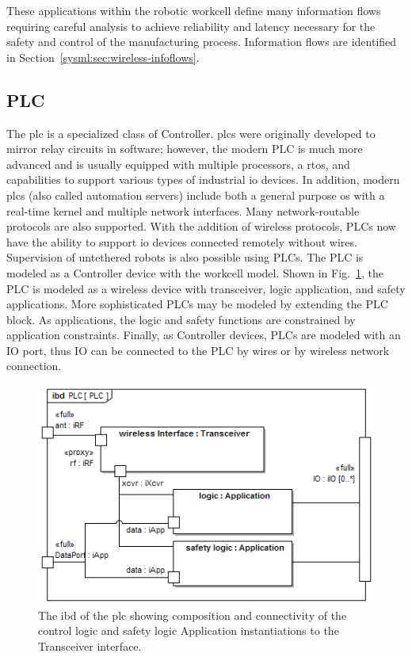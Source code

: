 These applications within the robotic workcell define many information flows requiring careful analysis to achieve reliability and latency necessary for the safety and control of the manufacturing process. Information flows are identified in Section~\ref{sysml:sec:wireless-infoflows}.

\subsection{PLC}\label{sysml:sec:plc}
The \gls{plc} is a specialized class of Controller.  \Glspl{plc} were originally developed to mirror relay circuits in software; however, the modern PLC is much more advanced and is usually equipped with multiple processors, a \gls{rtos}, and capabilities to support various types of industrial \gls{io} devices.  In addition, modern \glspl{plc} (also called automation servers) include both a general purpose \gls{os} with a real-time kernel and multiple network interfaces.  Many network-routable protocols are also supported.  With the addition of wireless protocols, PLCs now have the ability to support \gls{io} devices connected remotely without wires.  Supervision of untethered robots is also possible using PLCs.  The PLC is modeled as a Controller device with the workcell model.  Shown in Fig.~\ref{sysml:fig:PLC:ibd}, the PLC is modeled as a wireless device with transceiver, logic application, and safety applications.  More sophisticated PLCs may be modeled by extending the PLC block.  As applications, the logic and safety functions are constrained by application constraints. Finally, as Controller devices, PLCs are modeled with an IO port, thus IO can be connected to the PLC by wires or by wireless network connection.

\begin{figure}
	\centering
	\includegraphics[width=0.95\columnwidth]{./chapter-sysml/diagrams/ibd__PLC__PLC}
	\caption{The \gls{ibd} of the \gls{plc} showing composition and connectivity of the control logic and safety logic Application instantiations to the Transceiver interface. }
	\label{sysml:fig:PLC:ibd}
\end{figure}


